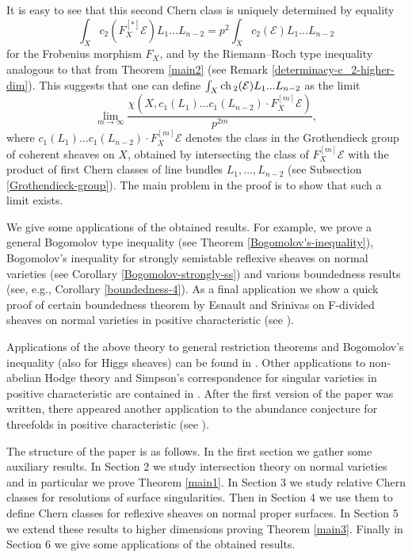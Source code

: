 \documentclass[twoside, 11pt]{article}
\theoremstyle{plain}
\theoremstyle{definition}
\theoremstyle{remark}
\newcommand{\cE}{{\mathcal E}}
\newcommand{\ch}{{\mathop{\rm ch \, }}}
\begin{document}
It is easy to see that this second Chern class is uniquely determined by equality
$$\int_Xc_2 ( F_X ^{[*]}\cE)L_1...L_{n-2} = p^2 \int_Xc_2(\cE)L_1...L_{n-2}$$
for the Frobenius morphism $F_X$,
 and  by the Riemann--Roch type inequality analogous to that from Theorem \ref{main2} (see Remark \ref{determinacy-c_2-higher-dim}). This suggests that one can define $\int _X \ch _2 (\cE)L_1...L_{n-2}$ as the limit
 $$\lim _{m\to \infty }\frac {  \chi (X, c_1(L_1)...c_1(L_{n-2}) \cdot {F_X^{[m]}\cE}  ) }{p^{2m}},$$
 where $c_1(L_1)...c_1(L_{n-2}) \cdot {F_X^{[m]}\cE} $ denotes the class in the Grothendieck group of coherent sheaves on $X$, obtained by intersecting the class of ${F_X^{[m]}\cE}$ with the product of first Chern classes of line bundles $L_1,..., L_{n-2}$ (see Subsection \ref{Grothendieck-group}).
The main problem in the proof is to show that such a limit exists.

\medskip

We give some applications of the obtained results. For example, we prove a general Bogomolov type inequality (see Theorem \ref{Bogomolov's-inequality}), Bogomolov's inequality for strongly semistable reflexive sheaves on normal varieties (see Corollary \ref{Bogomolov-strongly-ss}) and various boundedness results
(see, e.g.,  Corollary \ref{boundedness-4}). 
As a final application we show a quick proof of  certain boundedness theorem by Esnault and Srinivas on F-divided sheaves on normal varieties in positive characteristic (see \cite[Theorem 2.1]{ES}). 

Applications of the above theory to general restriction theorems and Bogomolov's inequality (also for Higgs sheaves) can be found in \cite{La4}. Other applications to non-abelian Hodge theory and Simpson's correspondence for singular varieties in positive characteristic are contained in \cite{La3}. After the first version of the paper was written, there appeared another application to  the abundance conjecture for threefolds in positive characteristic
(see \cite{Xu}).


\medskip

The structure of the paper is as follows. In the first section we gather some auxiliary results. In Section 2
we study intersection theory on normal varieties and in particular we prove Theorem \ref{main1}. In Section 3 we study relative Chern classes for resolutions of surface singularities. Then in Section 4 we use them to define Chern classes for reflexive sheaves on normal proper surfaces. In Section 5 we extend these results to higher dimensions proving Theorem \ref{main3}. Finally in Section 6 we give some applications of the obtained results.
\end{document}
